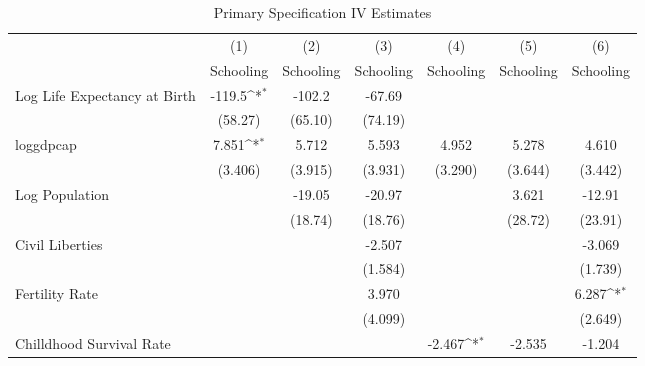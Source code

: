 \begin{table}[htbp]\centering
\def\sym#1{\ifmmode^{#1}\else\(^{#1}\)\fi}
\caption{Primary Specification IV Estimates}
\begin{tabular}{l*{6}{c}}
\toprule
                &\multicolumn{1}{c}{(1)}&\multicolumn{1}{c}{(2)}&\multicolumn{1}{c}{(3)}&\multicolumn{1}{c}{(4)}&\multicolumn{1}{c}{(5)}&\multicolumn{1}{c}{(6)}\\
                &\multicolumn{1}{c}{Schooling}&\multicolumn{1}{c}{Schooling}&\multicolumn{1}{c}{Schooling}&\multicolumn{1}{c}{Schooling}&\multicolumn{1}{c}{Schooling}&\multicolumn{1}{c}{Schooling}\\
\midrule
Log Life Expectancy at Birth&   -119.5\sym{*}  &   -102.2         &   -67.69         &                  &                  &                  \\
                &  (58.27)         &  (65.10)         &  (74.19)         &                  &                  &                  \\
\addlinespace
loggdpcap       &    7.851\sym{*}  &    5.712         &    5.593         &    4.952         &    5.278         &    4.610         \\
                &  (3.406)         &  (3.915)         &  (3.931)         &  (3.290)         &  (3.644)         &  (3.442)         \\
\addlinespace
Log Population  &                  &   -19.05         &   -20.97         &                  &    3.621         &   -12.91         \\
                &                  &  (18.74)         &  (18.76)         &                  &  (28.72)         &  (23.91)         \\
\addlinespace
Civil Liberties &                  &                  &   -2.507         &                  &                  &   -3.069         \\
                &                  &                  &  (1.584)         &                  &                  &  (1.739)         \\
\addlinespace
Fertility Rate  &                  &                  &    3.970         &                  &                  &    6.287\sym{*}  \\
                &                  &                  &  (4.099)         &                  &                  &  (2.649)         \\
\addlinespace
Chilldhood Survival Rate&                  &                  &                  &   -2.467\sym{*}  &   -2.535         &   -1.204         \\

\end{tabular}
\end{table}
